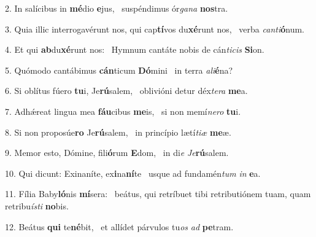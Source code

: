 2. In salícibus in \textbf{mé}dio \textbf{e}jus, \ast\  suspéndimus ór\textit{ga}\textit{na} \textbf{nos}tra.\

3. Quia illic interrogavérunt nos, qui cap\textbf{tí}vos du\textbf{xé}runt nos, \ast\  verba \textit{can}\textit{ti}\textbf{ó}num.\

4. Et qui \textbf{ab}du\textbf{xé}runt nos: \ast\  Hymnum cantáte nobis de cán\textit{ti}\textit{cis} \textbf{Si}on.\

5. Quómodo cantábimus \textbf{cán}ticum \textbf{Dó}mini \ast\  in terra \textit{a}\textit{li}\textbf{é}na?\

6. Si oblítus fúero \textbf{tu}i, Je\textbf{rú}salem, \ast\  oblivióni detur déx\textit{te}\textit{ra} \textbf{me}a.\

7. Adhǽreat lingua mea \textbf{fáu}cibus \textbf{me}is, \ast\  si non memí\textit{ne}\textit{ro} \textbf{tu}i.\

8. Si non proposúe\textbf{ro} Je\textbf{rú}salem, \ast\  in princípio lætí\textit{ti}\textit{æ} \textbf{me}æ.\

9. Memor esto, Dómine, fili\textbf{ó}rum \textbf{E}dom, \ast\  in di\textit{e} \textit{Je}\textbf{rú}salem.\

10. Qui dicunt: Exinaníte, ex\textbf{i}na\textbf{ní}te \ast\  usque ad fundamén\textit{tum} \textit{in} \textbf{e}a.\

11. Fília Baby\textbf{ló}nis \textbf{mí}sera: \ast\  beátus, qui retríbuet tibi retributiónem tuam, quam retribu\textit{ís}\textit{ti} \textbf{no}bis.\

12. Beátus \textbf{qui} te\textbf{né}bit, \ast\  et allídet párvulos tu\textit{os} \textit{ad} \textbf{pe}tram.\

